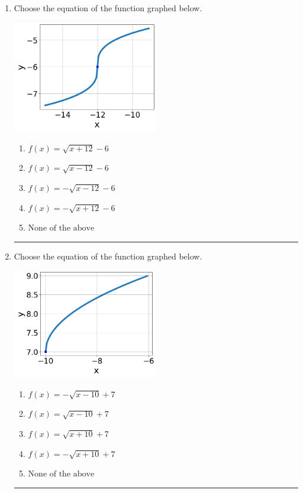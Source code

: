 \documentclass[14pt]{extbook}
\newcommand{\litem}[1]{\item#1\hspace*{-1cm}\rule{\textwidth}{0.4pt}}
\begin{document}
\begin{enumerate}
\litem{
Choose the equation of the function graphed below.
\begin{center}
    \includegraphics[width=0.5\textwidth]{../Figures/radicalGraphToEquationB.png}
\end{center}
\begin{enumerate}[label=\Alph*.]
\item \( f(x) = \sqrt{x + 12} - 6 \)
\item \( f(x) = \sqrt{x - 12} - 6 \)
\item \( f(x) = - \sqrt{x - 12} - 6 \)
\item \( f(x) = - \sqrt{x + 12} - 6 \)
\item \( \text{None of the above} \)

\end{enumerate} }
\litem{
Choose the equation of the function graphed below.
\begin{center}
    \includegraphics[width=0.5\textwidth]{../Figures/radicalGraphToEquationCopyB.png}
\end{center}
\begin{enumerate}[label=\Alph*.]
\item \( f(x) = - \sqrt{x - 10} + 7 \)
\item \( f(x) = \sqrt{x - 10} + 7 \)
\item \( f(x) = \sqrt{x + 10} + 7 \)
\item \( f(x) = - \sqrt{x + 10} + 7 \)
\item \( \text{None of the above} \)


\end{enumerate}}
\end{enumerate}
\end{document}
